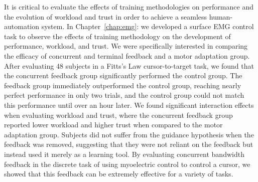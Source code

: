 It is critical to evaluate the effects of training methodologies on performance and the evolution of workload and trust in order to achieve a seamless human-automation system.
In Chapter~\ref{chap:emg}:  we developed a surface EMG control task to observe the effects of training methodology on the development of performance, workload, and trust.
We were specifically interested in comparing the efficacy of concurrent and terminal feedback and a motor adaptation group.
After evaluating 48 subjects in a Fitts's Law cursor-to-target task, we found that the concurrent feedback group significantly performed the control group.
The feedback group immediately outperformed the control group, reaching nearly perfect performance in only two trials, and the control group could not match this performance until over an hour later.
We found significant interaction effects when evaluating workload and trust, where the concurrent feedback group reported lower workload and higher trust when compared to the motor adaptation group.
Subjects did not suffer from the guidance hypothesis when the feedback was removed, suggesting that they were not reliant on the feedback but instead used it merely as a learning tool.
By evaluating concurrent bandwidth feedback in the discrete task of using myoelectric control to control a cursor, we showed that this feedback can be extremely effective for a variety of tasks.

